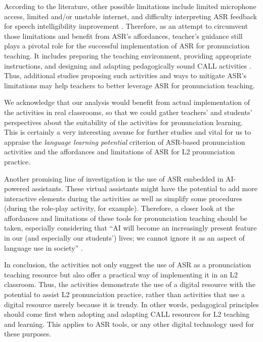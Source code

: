 \documentclass[english]{textolivre}
\begin{document}
According to the literature, other possible limitations include limited
microphone access, limited and/or unstable internet, and difficulty
interpreting ASR feedback for speech intelligibility improvement
\cite{gottardi2022,gottardi2023}. Therefore, as an attempt to
circumvent those limitations and benefit from ASR's affordances,
teacher's guidance still plays a pivotal role for the successful
implementation of ASR for pronunciation teaching. It includes preparing
the teaching environment, providing appropriate instructions, and
designing and adapting pedagogically sound CALL activities
\cite{gottardi2023,gottardi2022,liakina2022,silveira2022}. Thus,
additional studies proposing such activities and ways to mitigate ASR's
limitations may help teachers to better leverage ASR for pronunciation
teaching.

We acknowledge that our analysis would benefit from actual
implementation of the activities in real classrooms, so that we could
gather teachers' and students' perspectives about the suitability of the
activities for pronunciation learning. This is certainly a very
interesting avenue for further studies and vital for us to appraise the
\emph{language learning potential} criterion of ASR-based pronunciation
activities and the affordances and limitations of ASR for L2
pronunciation practice.

Another promising line of investigation is the use of ASR embedded in
AI-powered assistants. These virtual assistants might have the potential
to add more interactive elements during the activities as well as
simplify some procedures (during the role-play activity, for example).
Therefore, a closer look at the affordances and limitations of these
tools for pronunciation teaching should be taken, especially considering
that ``AI will become an increasingly present feature in our (and
especially our students') lives; we cannot ignore it as an aspect of
language use in society'' \cite[p.~530]{kern2024}.

In conclusion, the activities not only suggest the use of ASR as a
pronunciation teaching resource but also offer a practical way of
implementing it in an L2 classroom. Thus, the activities demonstrate the
use of a digital resource with the potential to assist L2 pronunciation
practice, rather than activities that use a digital resource merely
because it is trendy. In other words, pedagogical principles should come
first when adopting and adapting CALL resources for L2 teaching and
learning. This applies to ASR tools, or any other digital technology
used for these purposes.
\end{document}
